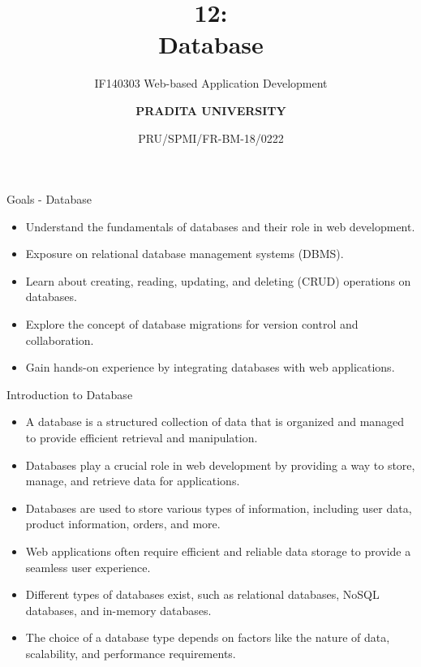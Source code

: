 \documentclass[aspectratio=169, table]{beamer}
\subtitle{IF140303 Web-based Application Development}
\title{\Huge {\textbf{12: \\Database}}}
\date[Serial]{\scriptsize {PRU/SPMI/FR-BM-18/0222}}
\author[Pradita]{\small {\textbf{PRADITA UNIVERSITY}}}
\begin{document}
\begin{frame}
    \titlepage
\end{frame}

\begin{frame}{Goals - Database}
    \vskip1cm
    \begin{itemize}
        \item Understand the fundamentals of databases and their role in web development.
        \item Exposure on relational database management systems (DBMS).
        \item Learn about creating, reading, updating, and deleting (CRUD) operations on databases.
        \item Explore the concept of database migrations for version control and collaboration.
        \item Gain hands-on experience by integrating databases with web applications.
    \end{itemize}
\end{frame}

\begin{frame}{Introduction to Database}
    \vskip1cm
    \begin{itemize}
        \item A database is a structured collection of data that is organized and managed to provide efficient retrieval and manipulation.
        \item Databases play a crucial role in web development by providing a way to store, manage, and retrieve data for applications.
        \item Databases are used to store various types of information, including user data, product information, orders, and more.
        \item Web applications often require efficient and reliable data storage to provide a seamless user experience.
        \item Different types of databases exist, such as relational databases, NoSQL databases, and in-memory databases.
        \item The choice of a database type depends on factors like the nature of data, scalability, and performance requirements.
    \end{itemize}
\end{frame}
\end{document}
